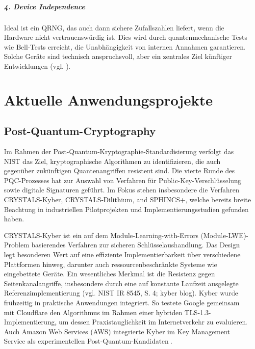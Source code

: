 \subparagraph{4. Device Independence}
Ideal ist ein QRNG, das auch dann sichere Zufallszahlen liefert, wenn die Hardware nicht vertrauenswürdig ist. Dies wird durch quantenmechanische Tests wie Bell-Tests erreicht, die Unabhängigkeit von internen Annahmen garantieren. Solche Geräte sind technisch anspruchsvoll, aber ein zentrales Ziel künftiger Entwicklungen (vgl. \cite{ma_x_et_al_quantum_2016}).
 

\section{Aktuelle Anwendungsprojekte}
\subsection{Post-Quantum-Cryptography}
\cite{}
Im Rahmen der Post-Quantum-Kryptographie-Standardisierung verfolgt das NIST das Ziel, kryptographische Algorithmen zu identifizieren, die auch gegenüber zukünftigen Quantenangriffen resistent sind. Die vierte Runde des PQC-Prozesses hat zur Auswahl von Verfahren für Public-Key-Verschlüsselung sowie digitale Signaturen geführt. Im Fokus stehen insbesondere die Verfahren CRYSTALS-Kyber, CRYSTALS-Dilithium, and SPHINCS+, welche bereits breite Beachtung in industriellen Pilotprojekten und Implementierungsstudien gefunden haben.

CRYSTALS-Kyber ist ein auf dem Module-Learning-with-Errors (Module-LWE)-Problem basierendes Verfahren zur sicheren Schlüsselaushandlung. Das Design legt besonderen Wert auf eine effiziente Implementierbarkeit über verschiedene Plattformen hinweg, darunter auch ressourcenbeschränkte Systeme wie eingebettete Geräte. Ein wesentliches Merkmal ist die Resistenz gegen Seitenkanalangriffe, insbesondere durch eine auf konstante Laufzeit ausgelegte Referenzimplementierung (vgl. NIST IR 8545, S. 4; kyber blog). Kyber wurde frühzeitig in praktische Anwendungen integriert. So testete Google gemeinsam mit Cloudflare den Algorithmus im Rahmen einer hybriden TLS-1.3-Implementierung, um dessen Praxistauglichkeit im Internetverkehr zu evaluieren. Auch Amazon Web Services (AWS) integrierte Kyber im Key Management Service als experimentellen Post-Quantum-Kandidaten \cite{sullivan_securing_2020, weibel_round_2020}.

